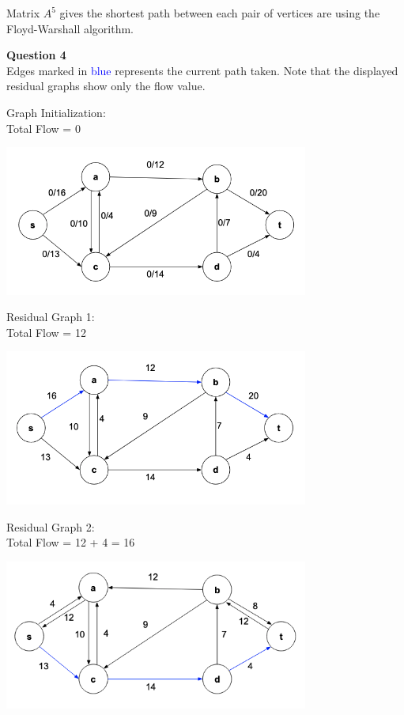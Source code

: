 \documentclass{article}
\begin{document}
Matrix $A^5$ gives the shortest path between each pair of vertices are using the Floyd-Warshall algorithm.  

\bigskip
{\bf Question 4}\\
Edges marked in \textcolor{blue}{blue} represents the current path taken. Note that the displayed residual graphs show only the flow value.

\bigskip
Graph Initialization:\\
Total Flow = 0
\begin{center}
    \includegraphics[width=0.75\textwidth]{4-1.png}
\end{center}

Residual Graph 1:\\
Total Flow = 12
\begin{center}
    \includegraphics[width=0.75\textwidth]{4-2.png}
\end{center}

Residual Graph 2:\\
Total Flow = 12 + 4 = 16
\begin{center}
    \includegraphics[width=0.75\textwidth]{4-3.png}
\end{center}
\end{document}
